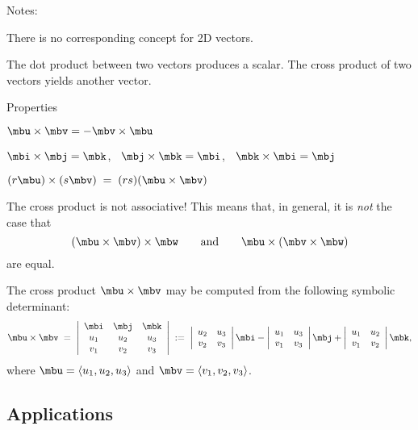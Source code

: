 \documentclass[12pt,fleqn]{article}
\def\newt{\vspace{0.2in}\ni}
\def\vcrossprod{\times}
\begin{document}
\newt
Notes:
\bi
\item
  There is no corresponding concept for 2D vectors.
\item
  The dot product between two vectors produces a scalar.
  The cross product of two vectors yields another vector.
\item
  Properties
  \be
  \item $\mbu\vcrossprod\mbv = -\mbv\vcrossprod\mbu$
  \item
	$\mbi\vcrossprod\mbj = \mbk$, $\;\;\mbj\vcrossprod\mbk = \mbi$,
	$\;\;\mbk\vcrossprod\mbi = \mbj$
  \item $(r\mbu)\vcrossprod (s\mbv) \;=\; (rs) (\mbu\vcrossprod\mbv)$
  \item
	The cross product is not associative!  This means that, in general,
	it is {\em not} the case that
	$$ (\mbu \vcrossprod \mbv) \vcrossprod \mbw \qquad\mbox{and}\qquad
		\mbu \vcrossprod (\mbv \vcrossprod \mbw) $$
	are equal.
  \ee
\item
  The cross product $\mbu\vcrossprod\mbv$ may be computed from
  the following symbolic determinant:
  $$ \mbu\vcrossprod\mbv \;=\; \left|\begin{array}{ccc}
	  \mbi & \mbj & \mbk \\ u_1 & u_2 & u_3 \\ v_1 & v_2 & v_3
	\end{array}\right| \;:=\;
	\left|\begin{array}{cc} u_2 & u_3 \\ v_2 & v_3 \end{array}\right|\mbi
	- \left|\begin{array}{cc} u_1 & u_3 \\ v_1 & v_3 \end{array}\right|\mbj
	+ \left|\begin{array}{cc} u_1 & u_2 \\ v_1 & v_2 \end{array}\right|\mbk, $$
  where $\mbu = \left<u_1, u_2, u_3\right>$ and
  $\mbv = \left<v_1, v_2, v_3\right>$.
\ei

\np
\ni
\subsection*{Applications}
\end{document}
